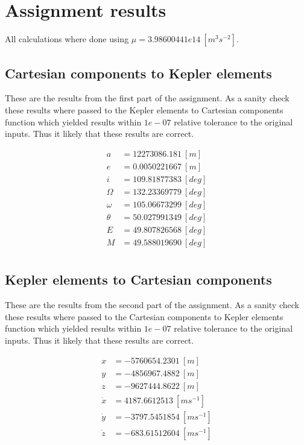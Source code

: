    \newpage
    \section{Assignment results}
    All calculations where done using $\mu=3.98600441e14\ [m^3 s^{-2}]$.

    \subsection{Cartesian components to Kepler elements}
    These are the results from the first part of the assignment. As a sanity check these results where passed to the Kepler elements to Cartesian components function which yielded results within $1e-07$ relative tolerance to the original inputs. Thus it likely that these results are correct.
    
    \begin{align*}
        a&=12273086.181\ [m] \\
        e&=0.0050221667\ [m] \\
        i&=109.81877383\ [deg] \\
        \Omega&=132.23369779\ [deg] \\
        \omega&=105.06673299\ [deg] \\
        \theta&=50.027991349\ [deg] \\
        E&=49.807826568\ [deg] \\
        M&=49.588019690\ [deg] \\
    \end{align*}

    \subsection{Kepler elements to Cartesian components}
    These are the results from the second part of the assignment. As a sanity check these results where passed to the Cartesian components to Kepler elements function which yielded results within $1e-07$ relative tolerance to the original inputs. Thus it likely that these results are correct.
    
    \begin{align*}
        x&=-5760654.2301\ [m] \\
        y&=-4856967.4882\ [m] \\
        z&=-9627444.8622\ [m] \\
        \dot{x}&=4187.6612513\ [m s^{-1}] \\
        \dot{y}&=-3797.5451854\ [m s^{-1}] \\
        \dot{z}&=-683.61512604\ [m s^{-1}] \\
    \end{align*}


